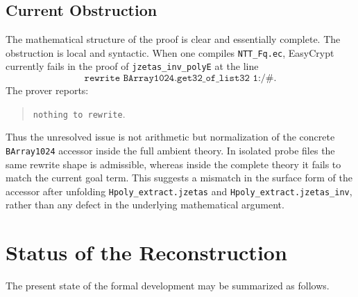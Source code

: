 \documentclass[11pt]{article}
\begin{document}
\subsection{Current Obstruction}

The mathematical structure of the proof is clear and essentially complete.
The obstruction is local and syntactic. When one compiles
\texttt{NTT\_Fq.ec}, EasyCrypt currently fails in the proof of
\texttt{jzetas\_inv\_polyE} at the line
\[
\texttt{rewrite BArray1024.get32\_of\_list32 1:/\#}.
\]
The prover reports:
\begin{quote}
\texttt{nothing to rewrite}.
\end{quote}

Thus the unresolved issue is not arithmetic but normalization of the concrete
\texttt{BArray1024} accessor inside the full ambient theory. In isolated probe
files the same rewrite shape is admissible, whereas inside the complete theory
it fails to match the current goal term. This suggests a mismatch in the
surface form of the accessor after unfolding \texttt{Hpoly\_extract.jzetas}
and \texttt{Hpoly\_extract.jzetas\_inv}, rather than any defect in the
underlying mathematical argument.

\section{Status of the Reconstruction}

The present state of the formal development may be summarized as follows.
\end{document}
